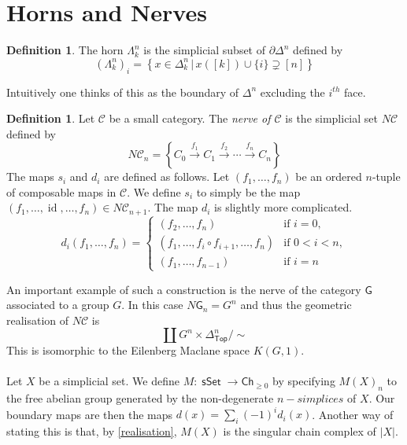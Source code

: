 \documentclass{amsart}
\DeclareMathOperator{\Top}{\mathsf{Top}}
\DeclareMathOperator{\msset}{\mathsf{sSet}}
\DeclareMathOperator{\id}{id} \DeclareMathOperator{\Fun}{Fun}
\theoremstyle{definition}
\newtheorem{definition}[theorem]{Definition}
\begin{document}
\section{Horns and Nerves}
\begin{definition}
  The horn $\Lambda^n_k$ is the simplicial subset of $\partial \Delta^n$ defined
  by
  $$
  (\Lambda^n_k)_i = \left\{ x\in \Delta^n_k\, \big| \, x([k])\cup \{ i \} \supsetneq [n] \right \}
  $$
\end{definition}
Intuitively one thinks of this as the boundary of $\Delta^n$ excluding the $i^{th}$ face.

\begin{definition}
  Let $\mathcal{C}$ be a small category. The \textit{nerve of $\mathcal{C}$} is
  the simplicial set $N\mathcal{C}$ defined by
  $$
  N \mathcal{C}_n =  \left\{ C_0\xrightarrow{f_1}C_1\xrightarrow{f_2}\cdots \xrightarrow{f_n} C_n \right\}
  $$
  The maps $s_i$ and $d_i$ are defined as follows. Let $(f_1,\ldots, f_n)$
  be an ordered $n$-tuple of composable maps in $\mathcal{C}$. We define $s_i$
  to simply be the map $(f_1,\ldots,\id,\ldots,f_n)\in N \mathcal{C}_{n+1}$. The
  map $d_i$ is slightly more complicated.
  \[
      d_i(f_1,\ldots,f_n) =
    \begin{cases}
      (f_2,\ldots,f_n) & \text{if }i=0,\\
      (f_1,\ldots,f_i\circ f_{i+1}, \ldots, f_n) &\text{if }0<i<n,\\
      (f_1,\ldots,f_{n-1}) &\text{if }i=n
    \end{cases}
  \]
\end{definition}

An important example of such a construction is the nerve of the category
$\mathsf{G}$ associated to a group $G$. In this case $N\mathsf{G}_n=G^n$
and thus the geometric realisation of $N \mathcal{C}$ is
$$
\coprod G^n\times \Delta^n_{\Top} \big/ \sim 
$$
This is isomorphic to the Eilenberg Maclane space $K(G,1)$.
\\
\\
\indent
Let $X$ be a simplicial set. We define $M: \msset \to \mathsf{Ch}_{\geq 0}$ by
specifying $M(X)_n$ to the free abelian group generated by the non-degenerate
$n-simplices$ of $X$. Our boundary maps are then the maps $d(x)=\sum_i (-1)^i
d_i(x)$. Another way of stating this is that, by \ref{realisation}, $M(X)$ is the singular chain complex
of $|X|$.
\end{document}
